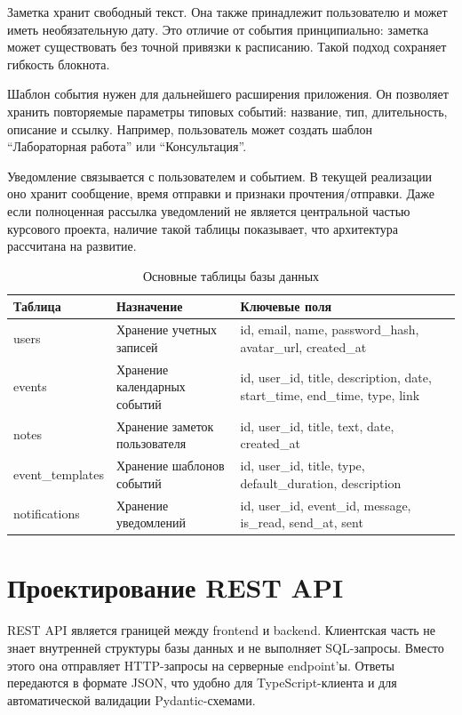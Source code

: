 \documentclass[14pt,a4paper]{extreport}
\begin{document}
Заметка хранит свободный текст. Она также принадлежит пользователю и может иметь необязательную дату. Это отличие от события принципиально: заметка может существовать без точной привязки к расписанию. Такой подход сохраняет гибкость блокнота.

Шаблон события нужен для дальнейшего расширения приложения. Он позволяет хранить повторяемые параметры типовых событий: название, тип, длительность, описание и ссылку. Например, пользователь может создать шаблон ``Лабораторная работа'' или ``Консультация''.

Уведомление связывается с пользователем и событием. В текущей реализации оно хранит сообщение, время отправки и признаки прочтения/отправки. Даже если полноценная рассылка уведомлений не является центральной частью курсового проекта, наличие такой таблицы показывает, что архитектура рассчитана на развитие.

\begin{longtable}{|p{}|p{}|p{}|}
\caption{Основные таблицы базы данных}\\
\hline
\textbf{Таблица} & \textbf{Назначение} & \textbf{Ключевые поля}\\
\hline
users & Хранение учетных записей & id, email, name, password\_hash, avatar\_url, created\_at\\
\hline
events & Хранение календарных событий & id, user\_id, title, description, date, start\_time, end\_time, type, link\\
\hline
notes & Хранение заметок пользователя & id, user\_id, title, text, date, created\_at\\
\hline
event\_templates & Хранение шаблонов событий & id, user\_id, title, type, default\_duration, description\\
\hline
notifications & Хранение уведомлений & id, user\_id, event\_id, message, is\_read, send\_at, sent\\
\hline
\end{longtable}

\section{Проектирование REST API}

REST API является границей между frontend и backend. Клиентская часть не знает внутренней структуры базы данных и не выполняет SQL-запросы. Вместо этого она отправляет HTTP-запросы на серверные endpoint'ы. Ответы передаются в формате JSON, что удобно для TypeScript-клиента и для автоматической валидации Pydantic-схемами.
\end{document}

